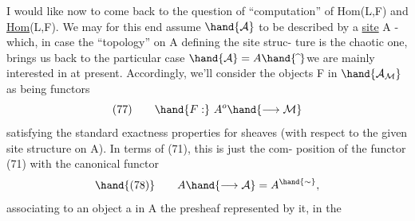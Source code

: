 I would like now to come back to the question of ``computation'' of
Hom(L,F) and \underline{Hom}(L,F). We may for this end assume $\hand{\mathcal{A}}$ to be described by
a \uline{site} A  - which, in case the ``topology'' on A defining the site struc-%
ture is the chaotic one, brings us back to the particular case $\hand{\mathcal{A}} = A\hand{\widehat{\ }}$\hand{/}we
are mainly interested in at present. Accordingly, we'll consider the
objects F in $\hand{\mathcal{A}_{\mathcal{M}}}$ as being functors
\[ (77) \qquad \hand{F:} \ A^{o} \hand{\longrightarrow \mathcal{M}} \]
satisfying the standard exactness properties for sheaves (with respect to
the given site structure on A). In terms of (71), this is just the com-%
position of the functor (71) with the canonical functor
\[ \hand{(78)} \qquad A \hand{\longrightarrow \mathcal{A}} = A^{\hand{\sim}} , \]
associating to an object a in A the presheaf represented by it, in the

